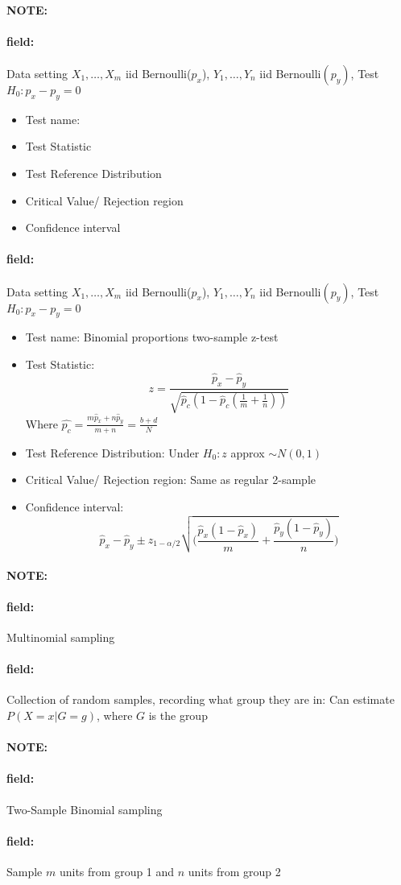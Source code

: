 \documentclass[12pt]{article}
\newenvironment{note}{\paragraph{NOTE:}}{}
\newenvironment{field}{\paragraph{field:}}{}
\begin{document}
\begin{note}
 \begin{field}
  Data setting $X_1, \ldots , X_m$ iid Bernoulli($p_x$), $Y_1, \ldots, Y_n$ iid Bernoulli$(p_y)$, Test $H_0: p_x - p_y = 0$
  \begin{itemize}
   \item Test name:
   \item Test Statistic
   \item Test Reference Distribution
   \item Critical Value/ Rejection region
   \item Confidence interval
  \end{itemize}
 \end{field}
 \begin{field}
  Data setting $X_1, \ldots , X_m$ iid Bernoulli($p_x$), $Y_1, \ldots, Y_n$ iid Bernoulli$(p_y)$, Test $H_0: p_x - p_y = 0$
  \begin{itemize}
   \item Test name: Binomial proportions two-sample z-test
   \item Test Statistic: $$ z = \frac{\hat{p}_x - \hat{p}_y}{\sqrt{\hat{p}_c(1 - \hat{p}_c(\frac{1}{m} + \frac{1}{n}))}} $$ Where $\hat{p_c} = \frac{m\hat{p}_x + n\hat{p}_y}{m+n} = \frac{b + d}{N}$
   \item Test Reference Distribution: Under $H_0: z $ approx $\sim N(0,1)$
   \item Critical Value/ Rejection region: Same as regular 2-sample
   \item Confidence interval: $$  \hat{p}_x - \hat{p}_y \pm z_{1 - \alpha/2} \sqrt{\big(\frac{\hat{p}_x(1 - \hat{p}_x)}{m} + \frac{\hat{p}_y(1 - \hat{p}_y)}{n}\big)}$$
  \end{itemize}
 \end{field}
\end{note}

\begin{note}
 \begin{field}
  Multinomial sampling
 \end{field}
 \begin{field}
  Collection of random samples, recording what group they are in: Can estimate $P(X = x | G = g)$, where $G$ is the group
 \end{field}
\end{note}


\begin{note}
 \begin{field}
  Two-Sample Binomial sampling
 \end{field}
 \begin{field}
  Sample $m$ units from group 1 and $n $ units from group 2
 \end{field}
\end{note}
\end{document}
